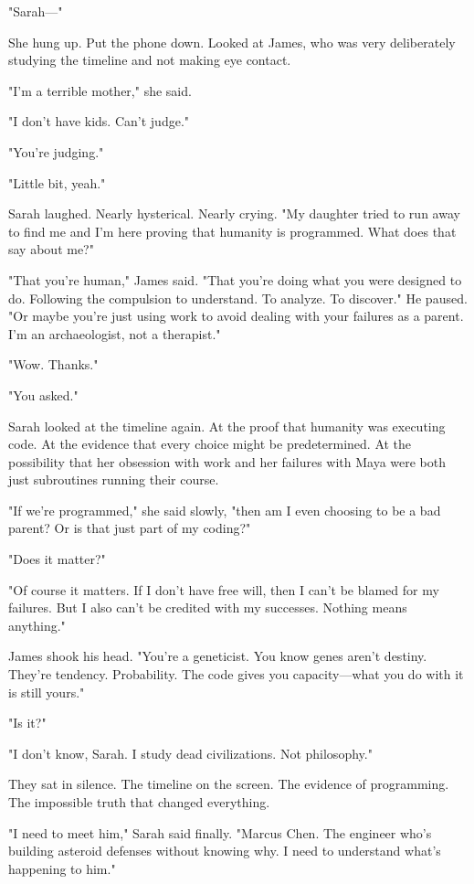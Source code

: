 "Sarah—"

She hung up. Put the phone down. Looked at James, who was very deliberately studying the timeline and not making eye contact.

"I'm a terrible mother," she said.

"I don't have kids. Can't judge."

"You're judging."

"Little bit, yeah."

Sarah laughed. Nearly hysterical. Nearly crying. "My daughter tried to run away to find me and I'm here proving that humanity is programmed. What does that say about me?"

"That you're human," James said. "That you're doing what you were designed to do. Following the compulsion to understand. To analyze. To discover." He paused. "Or maybe you're just using work to avoid dealing with your failures as a parent. I'm an archaeologist, not a therapist."

"Wow. Thanks."

"You asked."

Sarah looked at the timeline again. At the proof that humanity was executing code. At the evidence that every choice might be predetermined. At the possibility that her obsession with work and her failures with Maya were both just subroutines running their course.

"If we're programmed," she said slowly, "then am I even choosing to be a bad parent? Or is that just part of my coding?"

"Does it matter?"

"Of course it matters. If I don't have free will, then I can't be blamed for my failures. But I also can't be credited with my successes. Nothing means anything."

James shook his head. "You're a geneticist. You know genes aren't destiny. They're tendency. Probability. The code gives you capacity—what you do with it is still yours."

"Is it?"

"I don't know, Sarah. I study dead civilizations. Not philosophy."

They sat in silence. The timeline on the screen. The evidence of programming. The impossible truth that changed everything.

"I need to meet him," Sarah said finally. "Marcus Chen. The engineer who's building asteroid defenses without knowing why. I need to understand what's happening to him."

